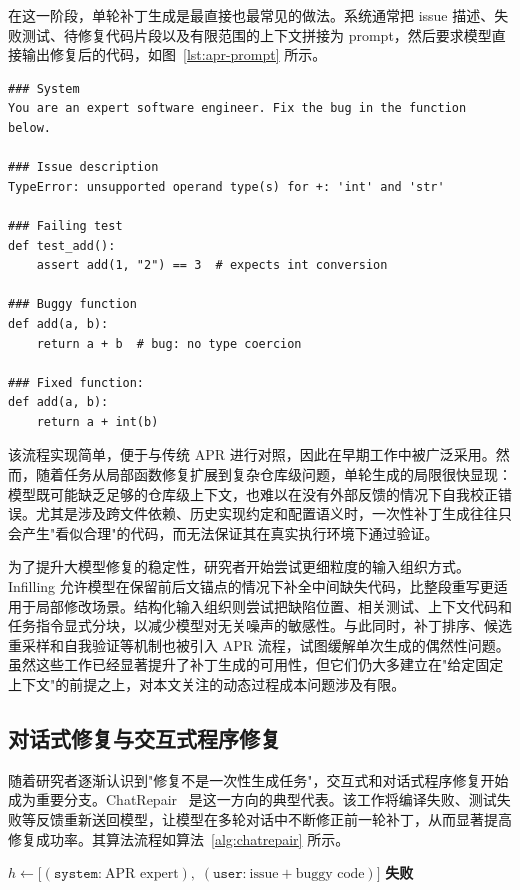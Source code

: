 在这一阶段，单轮补丁生成是最直接也最常见的做法。系统通常把 issue 描述、失败测试、待修复代码片段以及有限范围的上下文拼接为 prompt，然后要求模型直接输出修复后的代码，如图~\ref{lst:apr-prompt} 所示。

\begin{lstlisting}[style=promptstyle, caption={典型 LLM-based APR 单轮 prompt 示例}, label={lst:apr-prompt}]
### System
You are an expert software engineer. Fix the bug in the function below.

### Issue description
TypeError: unsupported operand type(s) for +: 'int' and 'str'

### Failing test
def test_add():
    assert add(1, "2") == 3  # expects int conversion

### Buggy function
def add(a, b):
    return a + b  # bug: no type coercion

### Fixed function:
def add(a, b):
    return a + int(b)
\end{lstlisting}

该流程实现简单，便于与传统 APR 进行对照，因此在早期工作中被广泛采用。然而，随着任务从局部函数修复扩展到复杂仓库级问题，单轮生成的局限很快显现：模型既可能缺乏足够的仓库级上下文，也难以在没有外部反馈的情况下自我校正错误。尤其是涉及跨文件依赖、历史实现约定和配置语义时，一次性补丁生成往往只会产生"看似合理"的代码，而无法保证其在真实执行环境下通过验证。

为了提升大模型修复的稳定性，研究者开始尝试更细粒度的输入组织方式。Infilling 允许模型在保留前后文锚点的情况下补全中间缺失代码，比整段重写更适用于局部修改场景。结构化输入组织则尝试把缺陷位置、相关测试、上下文代码和任务指令显式分块，以减少模型对无关噪声的敏感性。与此同时，补丁排序、候选重采样和自我验证等机制也被引入 APR 流程，试图缓解单次生成的偶然性问题。虽然这些工作已经显著提升了补丁生成的可用性，但它们仍大多建立在"给定固定上下文"的前提之上，对本文关注的动态过程成本问题涉及有限。

\subsection{对话式修复与交互式程序修复}

随着研究者逐渐认识到"修复不是一次性生成任务"，交互式和对话式程序修复开始成为重要分支。ChatRepair~\cite{xia2024keep} 是这一方向的典型代表。该工作将编译失败、测试失败等反馈重新送回模型，让模型在多轮对话中不断修正前一轮补丁，从而显著提高修复成功率。其算法流程如算法~\ref{alg:chatrepair} 所示。

\begin{algorithm}[H]
\caption{ChatRepair: 多轮对话式程序修复}
\label{alg:chatrepair}
$h \leftarrow \bigl[(\texttt{system:}\ \text{APR expert}),\;(\texttt{user:}\ \text{issue} + \text{buggy code})\bigr]$\;
\Return \textbf{失败}\;
\end{algorithm}

